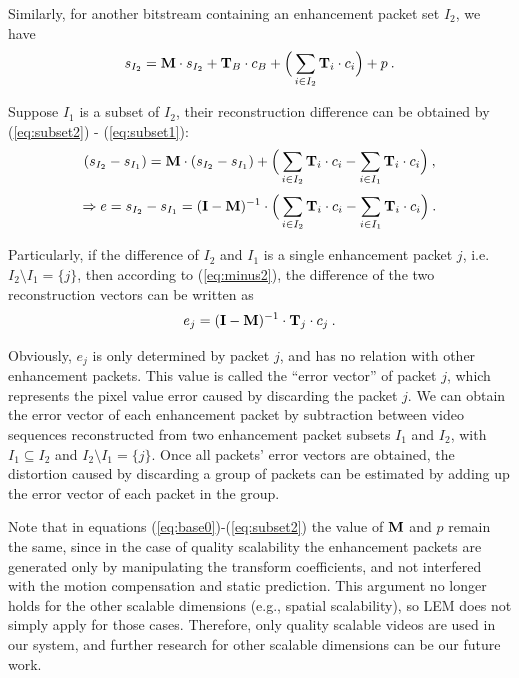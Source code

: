 \documentclass[journal]{IEEEtran}
\begin{document}
Similarly, for another bitstream containing an enhancement packet set $I_2$, we have
\begin{equation}
\label{eq:subset2}
s_{I_2} = {\rm\bf M} \cdot s_{I_2} + {\rm\bf T}_{B} \cdot c_{B} + \Big( \sum_{i \in I_2}{\rm\bf T}_i \cdot c_i \Big) + p \: .
\end{equation}

Suppose $I_1$ is a subset of $I_2$, their reconstruction difference can be obtained by (\ref{eq:subset2}) - (\ref{eq:subset1}):
\begin{equation}
\label{eq:minus1}
(s_{I_2} - s_{I_1}) = {\rm\bf M} \cdot (s_{I_2} - s_{I_1}) + \Big( \sum_{i \in I_2}{\rm\bf T}_i \cdot c_i - \sum_{i \in I_1}{\rm\bf T}_i \cdot c_i \Big) \: ,
\end{equation}
\begin{equation}
\label{eq:minus2}
\Rightarrow e = s_{I_2} - s_{I_1} = ({\rm\bf I - M})^{-1} \cdot \Big( \sum_{i \in I_2}{\rm\bf T}_i \cdot c_i - \sum_{i \in I_1}{\rm\bf T}_i \cdot c_i \Big) \: .
\end{equation}
	
Particularly, if the difference of $I_2$ and $I_1$ is a single enhancement packet $j$, i.e. $I_2 \setminus I_1 = \{j\}$, then according to (\ref{eq:minus2}), the difference of the two reconstruction vectors can be written as
\begin{equation}
\label{eq:error_j}
e_j = ({\rm\bf I - M})^{-1} \cdot {\rm\bf T}_j \cdot c_j \: .
\end{equation}
	
Obviously, $e_j$ is only determined by packet $j$, and has no relation with other enhancement packets. This value is called the ``error vector'' of packet $j$, which represents the pixel value error caused by discarding the packet $j$. We can obtain the error vector of each enhancement packet by subtraction between video sequences reconstructed from two enhancement packet subsets $I_1$ and $I_2$, with $I_1 \subseteq I_2$ and $I_2 \setminus I_1 =\{j\} $. Once all packets' error vectors are obtained, the distortion caused by discarding a group of packets can be estimated by adding up the error vector of each packet in the group.

Note that in equations (\ref{eq:base0})-(\ref{eq:subset2}) the value of ${\rm\bf M}$ and $p$ remain the same, since in the case of quality scalability the enhancement packets are generated only by manipulating the transform coefficients, and not interfered with the motion compensation and static prediction. This argument no longer holds for the other scalable dimensions (e.g., spatial scalability), so LEM does not simply apply for those cases. Therefore, only quality scalable videos are used in our system, and further research for other scalable dimensions can be our future work.
\end{document}
